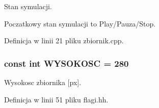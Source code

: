 Stan symulacji.

Poczatkowy stan symulacji to Play/\-Pauza/\-Stop. 

Definicja w linii 21 pliku zbiornik.\-cpp.

\hypertarget{flagi_8hh_a073767f0ac7dbf009a42b00de1092b52}{
\subsubsection[{W\-Y\-S\-O\-K\-O\-S\-C}]{\setlength{\rightskip}{0pt plus 5cm}const int W\-Y\-S\-O\-K\-O\-S\-C = 280}}\label{flagi_8hh_a073767f0ac7dbf009a42b00de1092b52}
Wysokosc zbiornika \mbox{[}px\mbox{]}. 

Definicja w linii 51 pliku flagi.\-hh.


